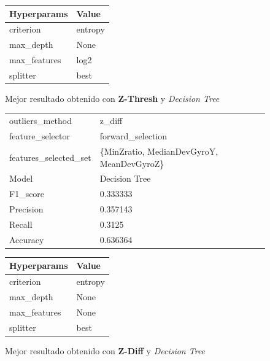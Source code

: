 \begin{appendices}
\begin{figure}[htb]
			\begin{tabular}{ll}
			\toprule
			 Hyperparams &   Value \\
			\midrule
			   criterion & entropy \\
			   max\_depth &    None \\
			max\_features &    log2 \\
				splitter &    best \\
			\bottomrule
			\end{tabular}
			\caption{Mejor resultado obtenido con \textbf{Z-Thresh} y \emph{Decision Tree}}
			\label{table:14}
		\end{figure}

		\begin{figure}[htb]
			\centering
			\begin{tabular}{ll}
				\toprule
					  outliers\_method &                                    z\_diff \\
					 feature\_selector &                         forward\_selection \\
				features\_selected\_set & \{MinZratio, MedianDevGyroY, MeanDevGyroZ\} \\
								Model &                             Decision Tree \\
						F1\_score &                                  0.333333 \\
					   Precision &                                  0.357143 \\
						  Recall &                                    0.3125 \\
						Accuracy &                                  0.636364 \\
				\bottomrule
			\end{tabular}
			\newline
			\newline

			\begin{tabular}{ll}
				\toprule
				 Hyperparams &   Value \\
				\midrule
				   criterion & entropy \\
				   max\_depth &    None \\
				max\_features &    None \\
					splitter &    best \\
				\bottomrule
			\end{tabular}
			\caption{Mejor resultado obtenido con \textbf{Z-Diff} y \emph{Decision Tree}}
			\label{table:14}
		\end{figure}


\end{appendices}
